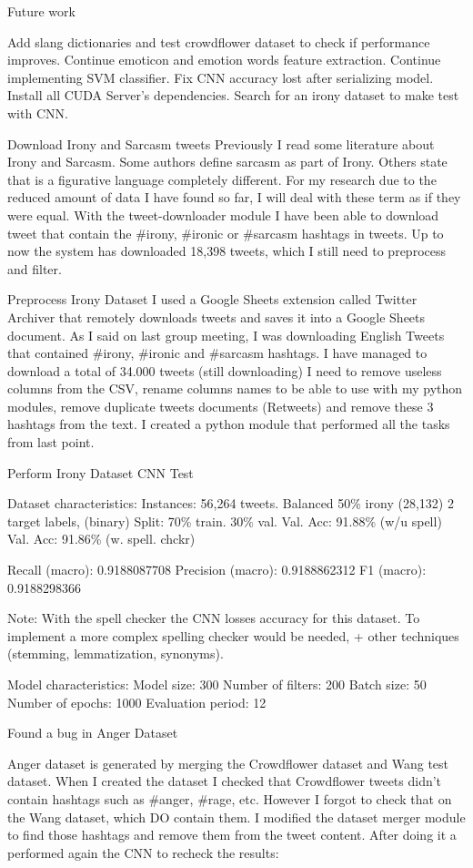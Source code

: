 Future work

Add slang dictionaries and test crowdflower dataset to check if performance improves.
Continue emoticon and emotion words feature extraction.
Continue implementing SVM classifier.
Fix CNN accuracy lost after serializing model.
Install all CUDA Server’s dependencies.
Search for an irony dataset to make test with CNN.

Download Irony and Sarcasm tweets
Previously I read some literature about Irony and Sarcasm. Some authors define sarcasm as part of Irony. Others state that is a figurative language completely different. For my research due to the reduced amount of data I have found so far, I will deal with these term as if they were equal.
With the tweet-downloader module I have been able to download tweet that contain the \#irony, \#ironic or \#sarcasm hashtags in tweets. Up to now the system has downloaded 18,398 tweets, which I still need to preprocess and filter.

Preprocess Irony Dataset
I used a Google Sheets extension called Twitter Archiver that remotely downloads tweets and saves it into a Google Sheets document.
As I said on last group meeting, I was downloading English Tweets that contained \#irony, \#ironic and \#sarcasm hashtags.
I have managed to download a total of 34.000 tweets (still downloading)
I need to remove useless columns from the CSV, rename columns names to be able to use with my python modules, remove duplicate tweets documents (Retweets) and remove these 3 hashtags from the text.
I created a python module that performed all the tasks from last point.

Perform Irony Dataset CNN Test

Dataset characteristics:
Instances: 56,264 tweets.
Balanced 50\% irony (28,132)
2 target labels, (binary)
Split: 70\% train. 30\% val.
Val. Acc: 91.88\% (w/u spell)
Val. Acc: 91.86\% (w. spell. chckr)

Recall (macro): 0.9188087708
Precision (macro): 0.9188862312
F1 (macro): 0.9188298366

Note: With the spell checker the CNN losses accuracy for this dataset. To implement a more complex spelling checker would be needed, + other techniques (stemming, lemmatization, synonyms).

Model characteristics:
Model size: 300
Number of filters: 200
Batch size: 50
Number of epochs: 1000
Evaluation period: 12

Found a bug in Anger Dataset

Anger dataset is generated by merging the Crowdflower dataset and Wang test dataset.
When I created the dataset I checked that Crowdflower tweets didn’t contain hashtags such as \#anger, \#rage, etc. However I forgot to check that on the Wang dataset, which  DO contain them. I modified the dataset merger module to find those hashtags and remove them from the tweet content. After doing it a performed again the CNN to recheck the results:

